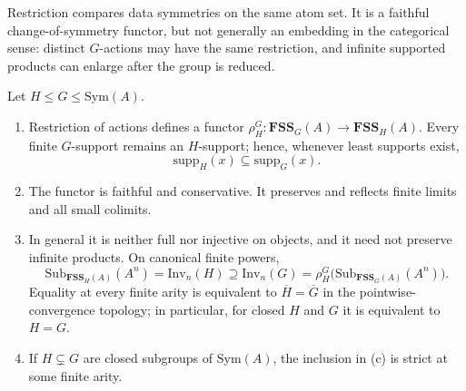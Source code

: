 \documentclass{lmcs}
\newcommand{\Sym}{\mathrm{Sym}}
\newcommand{\supp}{\mathrm{supp}}
\newcommand{\Inv}{\mathrm{Inv}}
\newcommand{\FSS}{\mathbf{FSS}}
\newcommand{\Sub}{\mathrm{Sub}}
\begin{document}
Restriction compares data symmetries on the same atom set. It is a
faithful change-of-symmetry functor, but not generally an embedding in the categorical sense: distinct $G$-actions may have the same
restriction, and infinite supported products can enlarge after the
group is reduced.

\begin{thm}\label{thm:restrict}
Let $H\leq G\leq\Sym(A)$.
\begin{enumerate}[label=\textup{(\alph*)}]
\item Restriction of actions defines a functor
$\rho^G_H:\FSS_G(A)\to\FSS_H(A)$. Every finite $G$-support remains
an $H$-support; hence, whenever least supports exist,
\[
   \supp_H(x)\subseteq\supp_G(x).
\]
\item The functor is faithful and conservative. It preserves and
reflects finite limits and all small colimits.
\item In general it is neither full nor injective on objects, and it
need not preserve infinite products. On canonical finite powers,
\[
\Sub_{\FSS_H(A)}(A^n)=\Inv_n(H)
\supseteq \Inv_n(G)
=\rho^G_H\bigl(\Sub_{\FSS_G(A)}(A^n)\bigr).
\]
Equality at every finite arity is equivalent to
$\overline H=\overline G$ in the pointwise-convergence topology; in
particular, for closed $H$ and $G$ it is equivalent to $H=G$.
\item If $H\subsetneq G$ are closed subgroups of $\Sym(A)$, the
inclusion in (c) is strict at some finite arity.
\end{enumerate}
\end{thm}
\end{document}
